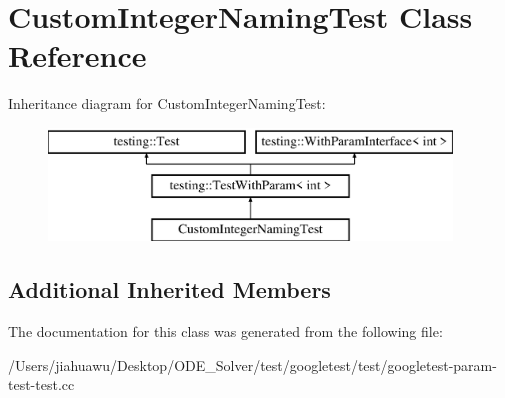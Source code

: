 \hypertarget{class_custom_integer_naming_test}{}\section{Custom\+Integer\+Naming\+Test Class Reference}
\label{class_custom_integer_naming_test}
Inheritance diagram for Custom\+Integer\+Naming\+Test\+:\begin{figure}[H]
\begin{center}
\leavevmode
\includegraphics[height=3.000000cm]{class_custom_integer_naming_test}
\end{center}
\end{figure}
\subsection*{Additional Inherited Members}


The documentation for this class was generated from the following file\+:\begin{DoxyCompactItemize}
\item 
/\+Users/jiahuawu/\+Desktop/\+O\+D\+E\+\_\+\+Solver/test/googletest/test/googletest-\/param-\/test-\/test.\+cc\end{DoxyCompactItemize}
